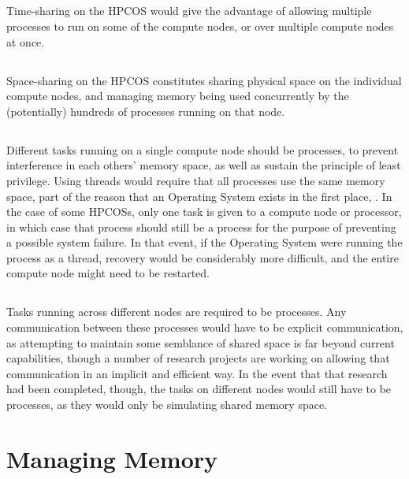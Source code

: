 \documentclass{article}
\begin{document}
\subsection{}
Time-sharing on the HPCOS would give the advantage of allowing multiple processes to run on some of the compute nodes, or over multiple compute nodes at once.

\subsection{}
Space-sharing on the HPCOS constitutes sharing physical space on the individual compute nodes, and managing memory being used concurrently by the (potentially) hundreds of processes running on that node.

\subsection{}
Different tasks running on a single compute node should be processes, to prevent interference in each others' memory space, as well as sustain the principle of least privilege. Using threads would require that all processes use the same memory space, part of the reason that an Operating System exists in the first place, .
In the case of some HPCOSs, only one task is given to a compute node or processor, in which case that process should still be a process for the purpose of preventing a possible system failure. In that event, if the Operating System were running the process as a thread, recovery would be considerably more difficult, and the entire compute node might need to be restarted.

\subsection{}
Tasks running across different nodes are required to be processes. Any communication between these processes would have to be explicit communication, as attempting to maintain some semblance of shared space is far beyond current capabilities, though a number of research projects are working on allowing that communication in an implicit and efficient way.
In the event that that research had been completed, though, the tasks on different nodes would still have to be processes, as they would only be simulating shared memory space.

\setcounter{section}{4}
\setcounter{subsection}{0}
\section*{Managing Memory}
\end{document}
